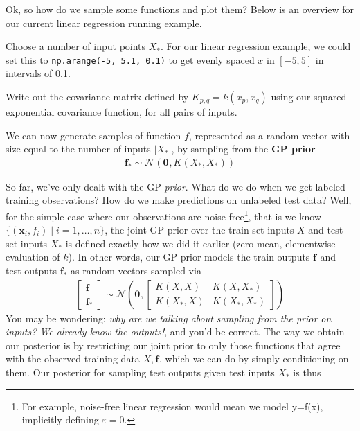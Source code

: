 \documentclass[11pt]{article}
\renewcommand\vec[2][]{\bm{#2}_{#1}}
\begin{document}
Ok, so how do we sample some functions and plot them? Below is an overview for our current linear regression running example.
\begin{compactenum}
	\item Choose a number of input points $X_*$. For our linear regression example, we could set this to \texttt{np.arange(-5, 5.1, 0.1)} to get evenly spaced $x$ in $[-5, 5]$ in intervals of 0.1. 
	
	\item Write out the covariance matrix defined by $K_{p, q} = k(x_p, x_q)$ using our squared exponential covariance function, for all pairs of inputs. 
	
	\item We can now generate samples of function $f$, represented as a random vector with size equal to the number of inputs $|X_*|$, by sampling from the \textbf{GP prior}
	\begin{align}
		\vec[*]{f} \sim \mathcal{N}(\vec 0, K(X_*, X_*))
	\end{align}
\end{compactenum}
So far, we've only dealt with the GP \textit{prior}. What do we do when we get labeled training observations? How do we make predictions on unlabeled test data? Well, for the simple case where our observations are noise free\footnote{For example, noise-free linear regression would mean we model y=f(x), implicitly defining $\varepsilon=0$.}, that is we know $\{ (\vec[i]{x}, f_i) \mid i = 1,\ldots,n \}$, the joint GP prior over the train set inputs $X$ and test set inputs $X_*$ is defined exactly how we did it earlier (zero mean, elementwise evaluation of $k$). In other words, our GP prior models the train outputs $\vec f$ and test outputs $\vec[*]{f}$ as random vectors sampled via
\begin{align}
	\begin{bmatrix}
		\vec f \\
		\vec[*]{f}
	\end{bmatrix}
	\sim
	\mathcal{N}\left(
		\vec 0, 
		\begin{bmatrix}
			K(X, X) & K(X, X_*) \\
			K(X_*, X) & K(X_*, X_*)
		\end{bmatrix}
	\right)
\end{align} 
You may be wondering: \textit{why are we talking about sampling from the prior on inputs? We already know the outputs!}, and you'd be correct. The way we obtain our posterior is by restricting our joint prior to only those functions that agree with the observed training data $X, \vec f$, which we can do by simply conditioning on them. Our posterior for sampling test outputs given test inputs $X_*$ is thus
\graybox{
	\begin{split}
	\vec[*]{f}\mid X_*, X, \vec f
		\sim \mathcal{N}\bigg(
			&K(X_*, X)K(X, X)^{-1}\vec f, \\
			&K(X_*, X_*) - K(X_*, X)K(X, X)^{-1}K(X, X_*)\bigg)	
	\end{split}
}
\end{document}
